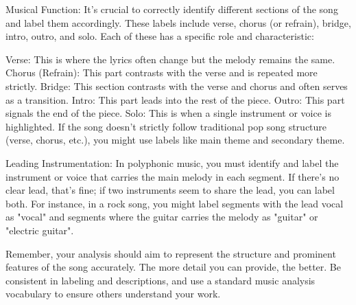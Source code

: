 Musical Function: It's crucial to correctly identify different sections of the song and label them accordingly. These labels include verse, chorus (or refrain), bridge, intro, outro, and solo. Each of these has a specific role and characteristic:

Verse: This is where the lyrics often change but the melody remains the same.
Chorus (Refrain): This part contrasts with the verse and is repeated more strictly.
Bridge: This section contrasts with the verse and chorus and often serves as a transition.
Intro: This part leads into the rest of the piece.
Outro: This part signals the end of the piece.
Solo: This is when a single instrument or voice is highlighted.
If the song doesn't strictly follow traditional pop song structure (verse, chorus, etc.), you might use labels like main theme and secondary theme.

Leading Instrumentation: In polyphonic music, you must identify and label the instrument or voice that carries the main melody in each segment. If there's no clear lead, that's fine; if two instruments seem to share the lead, you can label both. For instance, in a rock song, you might label segments with the lead vocal as "vocal" and segments where the guitar carries the melody as "guitar" or "electric guitar".

Remember, your analysis should aim to represent the structure and prominent features of the song accurately. The more detail you can provide, the better. Be consistent in labeling and descriptions, and use a standard music analysis vocabulary to ensure others understand your work.